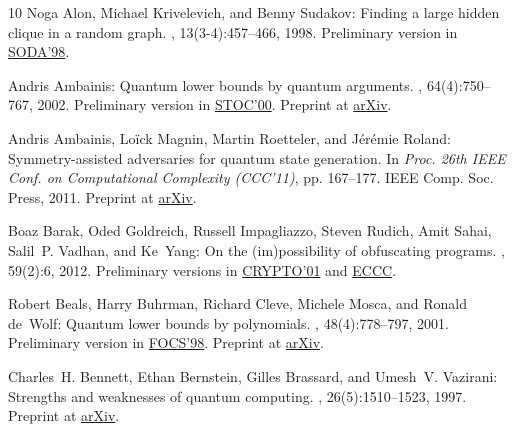 \begin{thebibliography}{10}
{\sc Noga Alon, Michael Krivelevich, and Benny Sudakov}: Finding a large hidden
  clique in a random graph.
, 13(3-4):457--466, 1998.
\newblock Preliminary version in
  \href{http://dl.acm.org/citation.cfm?id=314613.315014}{SODA'98}.

{\sc Andris Ambainis}: Quantum lower bounds by quantum arguments.
, 64(4):750--767, 2002.
\newblock Preliminary version in
  \href{http://dx.doi.org/10.1145/335305.335394}{STOC'00}. Preprint at
  \href{http://arxiv.org/abs/quant-ph/0002066}{arXiv}.

{\sc Andris Ambainis, Lo\"{i}ck Magnin, Martin Roetteler, and J\'{e}r\'{e}mie
  Roland}: Symmetry-assisted adversaries for quantum state generation.
\newblock In {\em Proc. 26th IEEE Conf. on Computational Complexity (CCC'11)},
  pp. 167--177. IEEE Comp. Soc. Press, 2011.
\newblock Preprint at \href{http://arxiv.org/abs/1012.2112}{arXiv}.

{\sc Boaz Barak, Oded Goldreich, Russell Impagliazzo, Steven Rudich, Amit
  Sahai, Salil~P. Vadhan, and Ke~Yang}: On the (im)possibility of obfuscating
  programs.
, 59(2):6, 2012.
\newblock Preliminary versions in
  \href{http://dx.doi.org/10.1007/3-540-44647-8_1}{CRYPTO'01} and
  \href{http://eccc.hpi-web.de/report/2001/057/}{ECCC}.
\newblock [\epfmtdoi{10.1145/2160158.2160159}]

{\sc Robert Beals, Harry Buhrman, Richard Cleve, Michele Mosca, and Ronald
  de~Wolf}: Quantum lower bounds by polynomials.
, 48(4):778--797, 2001.
\newblock Preliminary version in
  \href{http://dx.doi.org/10.1109/SFCS.1998.743485}{FOCS'98}. Preprint at
  \href{http://arxiv.org/abs/quant-ph/9802049}{arXiv}.
\newblock [\epfmtdoi{10.1145/502090.502097}]

{\sc Charles~H. Bennett, Ethan Bernstein, Gilles Brassard, and Umesh~V.
  Vazirani}: Strengths and weaknesses of quantum computing.
, 26(5):1510--1523, 1997.
\newblock Preprint at \href{http://arxiv.org/abs/quant-ph/9701001}{arXiv}.
\newblock [\epfmtdoi{10.1137/S0097539796300933}]


\end{thebibliography}
